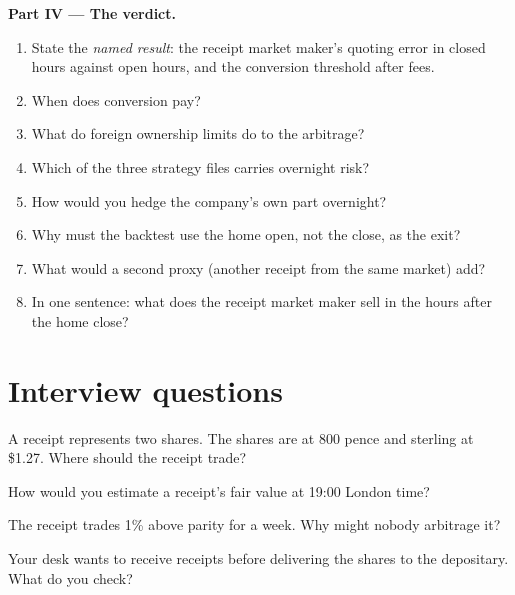 \begin{problem}
\medskip\noindent\textbf{Part IV --- The verdict.}
\begin{enumerate}[resume]
\item State the \emph{named result}: the receipt market maker's quoting error in closed hours against open hours, and the conversion threshold after
fees.
\item When does conversion pay?
\item What do foreign ownership limits do to the arbitrage?
\item Which of the three strategy files carries overnight risk?
\item How would you hedge the company's own part overnight?
\item Why must the backtest use the home open, not the close, as the exit?
\item What would a second proxy (another receipt from the same market) add?
\item In one sentence: what does the receipt market maker sell in the hours after the home close?
\end{enumerate}
\end{problem}

\section{Interview questions}

\begin{interviewq}\label{iq:hf:depositary-receipts-and-dual-listings:1}
A receipt represents two shares. The shares are at 800 pence and sterling at \$1.27. Where should the receipt trade?
\end{interviewq}

\begin{interviewq}\label{iq:hf:depositary-receipts-and-dual-listings:2}
How would you estimate a receipt's fair value at 19:00 London time?
\end{interviewq}

\begin{interviewq}\label{iq:hf:depositary-receipts-and-dual-listings:3}
The receipt trades 1\% above parity for a week. Why might nobody arbitrage it?
\end{interviewq}

\begin{interviewq}\label{iq:hf:depositary-receipts-and-dual-listings:4}
Your desk wants to receive receipts before delivering the shares to the depositary. What do you check?
\end{interviewq}

